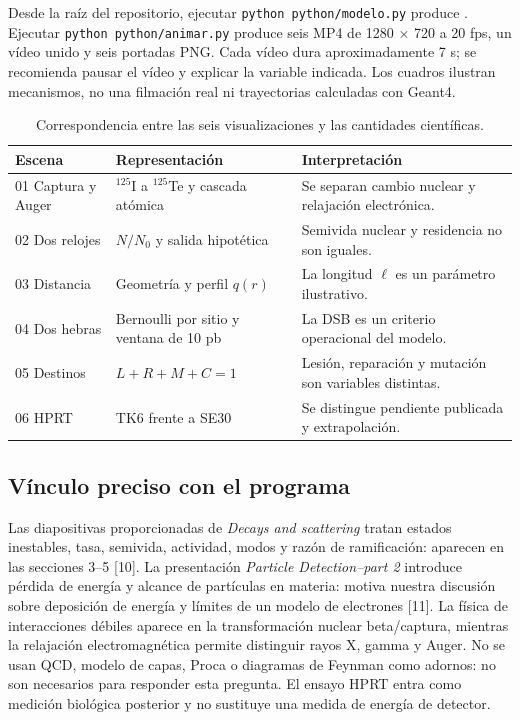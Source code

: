 \documentclass[11pt,a4paper,oneside]{article}
\begin{document}
Desde la raíz del repositorio, ejecutar \texttt{python\ python/modelo.py} produce . Ejecutar \texttt{python\ python/animar.py} produce seis MP4 de 1280 × 720 a 20 fps, un vídeo unido y seis portadas PNG. Cada vídeo dura aproximadamente 7 s; se recomienda pausar el vídeo y explicar la variable indicada. Los cuadros ilustran mecanismos, no una filmación real ni trayectorias calculadas con Geant4.

\begin{table}[htbp]\centering\footnotesize
\begin{tabularx}{\linewidth}{@{}p{.20\linewidth}p{.34\linewidth}X@{}}
\toprule Escena & Representación & Interpretación\\\midrule
01 Captura y Auger & $^{125}$I a $^{125}$Te y cascada atómica & Se separan cambio nuclear y relajación electrónica.\\
02 Dos relojes & $N/N_0$ y salida hipotética & Semivida nuclear y residencia no son iguales.\\
03 Distancia & Geometría y perfil $q(r)$ & La longitud $\ell$ es un parámetro ilustrativo.\\
04 Dos hebras & Bernoulli por sitio y ventana de 10 pb & La DSB es un criterio operacional del modelo.\\
05 Destinos & $L+R+M+C=1$ & Lesión, reparación y mutación son variables distintas.\\
06 HPRT & TK6 frente a SE30 & Se distingue pendiente publicada y extrapolación.\\\bottomrule
\end{tabularx}
\caption{Correspondencia entre las seis visualizaciones y las cantidades científicas.}
\end{table}

\subsection{Vínculo preciso con el programa}\label{vuxednculo-preciso-con-el-programa}

Las diapositivas proporcionadas de \emph{Decays and scattering} tratan estados inestables, tasa, semivida, actividad, modos y razón de ramificación: aparecen en las secciones 3--5 {[}10{]}. La presentación \emph{Particle Detection--part 2} introduce pérdida de energía y alcance de partículas en materia: motiva nuestra discusión sobre deposición de energía y límites de un modelo de electrones {[}11{]}. La física de interacciones débiles aparece en la transformación nuclear beta/captura, mientras la relajación electromagnética permite distinguir rayos X, gamma y Auger. No se usan QCD, modelo de capas, Proca o diagramas de Feynman como adornos: no son necesarios para responder esta pregunta. El ensayo HPRT entra como medición biológica posterior y no sustituye una medida de energía de detector.
\end{document}
